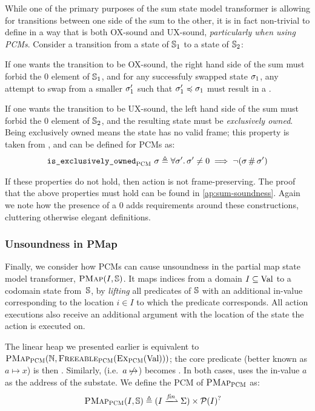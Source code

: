 While one of the primary purposes of the sum state model transformer is allowing for transitions between one side of the sum to the other, it is in fact non-trivial to define in a way that is both OX-sound and UX-sound, \emph{particularly when using PCMs}. Consider a transition from a state of $\mathbb S_1$ to a state of $\mathbb S_2$:
\begin{compactitem}
 \item If one wants the transition to be OX-sound, the right hand side of the sum must forbid the $0$ element of $\mathbb S_1$, and for any successfuly swapped state $\sigma_1$, any attempt to swap from a smaller $\sigma_1'$ such that $\sigma_1'\preccurlyeq\sigma_1$ must result in a \Miss.
 \item If one wants the transition to be UX-sound, the left hand side of the sum must forbid the $0$ element of $\mathbb S_2$, and the resulting state must be \emph{exclusively owned}. Being exclusively owned means the state has no valid frame; this property is taken from \cite{iris}, and can be defined for PCMs as: \begin{align*}
	\texttt{is\_exclusively\_owned}_{\textsc{PCM}}~\sigma \triangleq \forall \sigma'\ldotp \sigma'\neq 0\implies \neg(\sigma\operatorname{\#}\sigma')
\end{align*}
\end{compactitem}

If these properties do not hold, then action is not frame-preserving. The proof that the above properties must hold can be found in \cref{ap:sum-soundness}. Again we note how the presence of a $0$ adds requirements around these constructions, cluttering otherwise elegant definitions.

\subsubsection{Unsoundness in PMap}

Finally, we consider how PCMs can cause unsoundness in the partial map state model transformer, $\textsc{PMap}(I, \mathbb S)$. It maps indices from a domain $I\subseteq\text{Val}$ to a codomain state from~$\mathbb S$, by \emph{lifting} all predicates of $\mathbb S$ with an additional in-value corresponding to the location $i\in I$ to which the predicate corresponds. All action executions also receive an additional argument with the location of the state the action is executed on.

The linear heap we presented earlier is equivalent to $\textsc{PMap}_{\textsc{PCM}}(\mathbb N, \textsc{Freeable}_{\textsc{PCM}}(\textsc{Ex}_{\textsc{PCM}}(\text{Val})))$; the core predicate  (better known as $a\mapsto x$) is then . Similarly,  (i.e.~$a\not\mapsto$) becomes . In both cases, \PMap{} uses the in-value $a$ as the address of the substate. We define the PCM of $\textsc{PMap}_{\textsc{PCM}}$ as: \begin{align*}
	\PMap_\PCM(I, \mmdl) &\defeq (I \finmap \St) \times \pset(I)^?
\end{align*}

